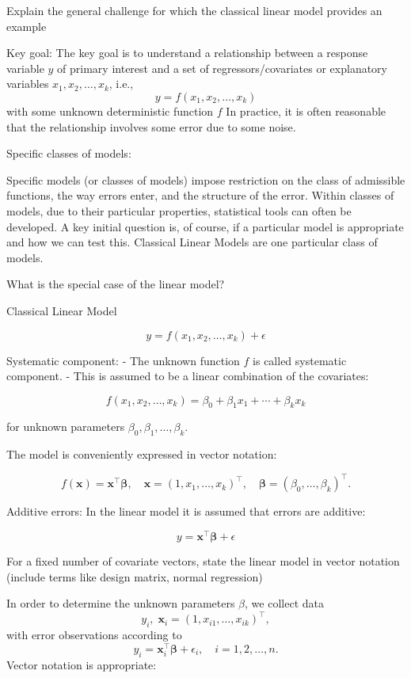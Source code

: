 Explain the general challenge for which the classical linear
model provides an example


Key goal:
The key goal is to understand a relationship between a response variable \( y \) of primary interest and a set of regressors/covariates or explanatory variables 
\( x_1, x_2, \ldots, x_k \), i.e.,
\[
 y = f(x_1, x_2, \ldots, x_k)
\]
with some unknown deterministic function \( f \)
In practice, it is often reasonable that the relationship involves some error due to some noise.

Specific classes of models:

Specific models (or classes of models) impose restriction on the class of admissible functions, the way errors enter, and the structure of the error.
Within classes of models, due to their particular properties, statistical tools can often be developed.
A key initial question is, of course, if a particular model is appropriate and how we can test this.
Classical Linear Models are one particular class of models.

What is the special case of the linear model?

Classical Linear Model

\[ y = f(x_1, x_2, \ldots, x_k) + \epsilon \]

Systematic component:
- The unknown function \( f \) is called systematic component.
- This is assumed to be a linear combination of the covariates:

\[ f(x_1, x_2, \ldots, x_k) = \beta_0 + \beta_1 x_1 + \cdots + \beta_k x_k \]

for unknown parameters \( \beta_0, \beta_1, \ldots, \beta_k \).

The model is conveniently expressed in vector notation:

\[ f(\mathbf{x}) = \mathbf{x}^\top \boldsymbol{\beta}, \quad \mathbf{x} = (1, x_1, \ldots, x_k)^\top, \quad \boldsymbol{\beta} = (\beta_0, \ldots, \beta_k)^\top. \]

Additive errors:
In the linear model it is assumed that errors are additive:

\[ y = \mathbf{x}^\top \boldsymbol{\beta} + \epsilon \]



For a fixed number of covariate vectors, state the linear model in vector notation
(include terms like design matrix, normal regression)


In order to determine the unknown parameters \(\beta\), we collect data
\[ y_i, \; \mathbf{x}_i = (1, x_{i1}, \ldots, x_{ik})^\top, \]
with error observations according to
\[ y_i = \mathbf{x}_i^\top \boldsymbol{\beta} + \epsilon_i, \quad i = 1, 2, \ldots, n. \]
Vector notation is appropriate:

